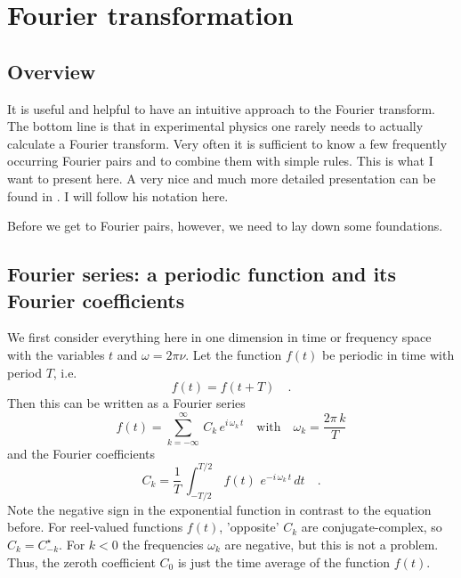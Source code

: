 \renewcommand{\lastmod}{September 18, 2023}
\renewcommand{\chapterauthors}{Markus Lippitz}

\chapter{Fourier transformation}
\label{chap:appendix_Fourier}

\section{Overview}

It is useful and helpful to have an intuitive approach to the Fourier transform. The bottom line is that in experimental physics one rarely needs to actually calculate a Fourier transform. Very often it is sufficient to know a few frequently occurring Fourier pairs and to combine them with simple rules. This is what I want to present here. A very nice and much more detailed presentation can be found in \cite{Butz2015}. I will follow his notation here.

Before we get to Fourier pairs, however, we need to lay down some foundations.

\section{Fourier series: a periodic function and its Fourier coefficients}

We first consider everything here in one dimension in time or frequency space with the variables $t$ and $\omega = 2 \pi \nu$. Let the function $f(t)$ be periodic in time with period $T$, i.e. 
\begin{equation}
 f(t) = f (t + T) \quad .
\end{equation}
Then this can be written as a Fourier series
\begin{equation}
 f(t) = \sum_{k=-\infty}^{\infty} \, C_k \, e^{i \, \omega_k \, t}
 \quad \text{with} \quad \omega_k = \frac{2 \pi \, k}{T}
\end{equation}
and the Fourier coefficients
\begin{equation}
 C_k = \frac{1}{T} \, \int_{-T/2}^{T/2} \, f(t) \, \, e^{-i \, \omega_k \, t} \, dt \quad .
\end{equation}
Note the negative sign in the exponential function in contrast to the equation before. For reel-valued functions $f(t)$, 'opposite' $C_k$ are conjugate-complex, so $C_k = C_{-k}^\star$. For $k<0$ the frequencies $\omega_k$ are negative, but this is not a problem. Thus, the zeroth coefficient $C_0$ is just the time average of the function $f(t)$.



